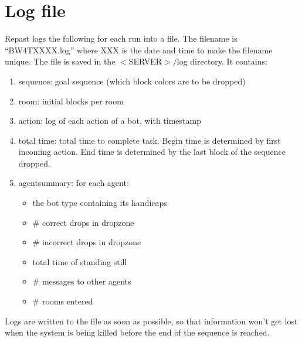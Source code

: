 \documentclass[11pt,a4paper]{article}
\begin{document}
\section{Log file}
Repast logs the following for each run into a file. The filename is “BW4TXXXX.log” where XXX is the date and time to make the filename unique. The file is saved in the $<$SERVER$>/$log directory. It contains:
\begin{enumerate}
\item sequence: goal sequence (which block colors are to be dropped)
\item room: initial blocks per room
\item action: log of each action of a bot, with timestamp 
\item total time: total time to complete task. Begin time is determined by first incoming action. End time is determined by the last block of the sequence dropped.
\item agentsummary: for each agent:
    \begin{itemize}
    \item the bot type containing its handicaps
    \item \# correct drops in dropzone
    \item \# incorrect drops in dropzone
    \item total time of standing still
    \item \# messages to other agents
    \item \# rooms entered
    \end{itemize}
\end{enumerate}
Logs are written to the file as soon as possible, so that information won't get lost when the system is being killed before the end of the sequence is reached.
\end{document}
